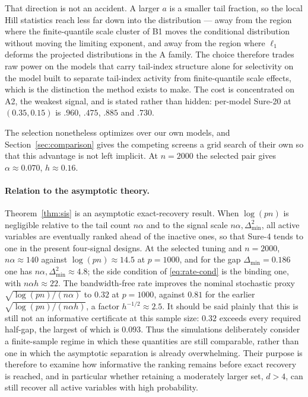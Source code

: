 That direction is not an accident. A larger $a$ is a smaller tail
fraction, so the local Hill statistics reach less far down into the
distribution --- away from the region where the finite-quantile scale
cluster of B1 moves the conditional distribution without moving the
limiting exponent, and away from the region where $\ell_1$ deforms the
projected distributions in the A family. The choice therefore trades raw
power on the models that carry tail-index structure alone for
selectivity on the model built to separate tail-index activity from
finite-quantile scale effects, which is the distinction the method
exists to make. The cost is concentrated on A2, the weakest signal, and
is stated rather than hidden: per-model Sure-20 at $(0.35,0.15)$ is
$.960$, $.475$, $.885$ and $.730$.

The selection nonetheless optimizes over our own models, and
Section~\ref{sec:comparison} gives the competing screens a grid search
of their own so that this advantage is not left implicit. At $n=2000$
the selected pair gives $\alpha\approx0.070$, $h\approx0.16$.

\paragraph{Relation to the asymptotic theory.}
Theorem~\ref{thm:sis} is an asymptotic exact-recovery result. When $\log(pn)$ is negligible relative to the tail count $n\alpha$ and to the signal scale $n\alpha,\Delta_{\min}^2$, all active variables are eventually ranked ahead of the inactive ones, so that Sure-4 tends to one in the present four-signal designs. At the selected tuning and $n=2000$, $n\alpha\approx140$ against $\log(pn)\approx14.5$ at $p=1000$, and for the gap $\Delta_{\min}=0.186$ one has $n\alpha,\Delta_{\min}^2\approx4.8$; the side condition of \eqref{eq:rate-cond} is the binding one, with $n\alpha h\approx22$. The bandwidth-free rate improves the nominal stochastic proxy $\sqrt{\log(pn)/(n\alpha)}$ to $0.32$ at $p=1000$, against $0.81$ for the earlier $\sqrt{\log(pn)/(n\alpha h)}$, a factor $h^{-1/2}\approx2.5$. It should be said plainly that this is still not an informative certificate at this sample size: $0.32$ exceeds every required half-gap, the largest of which is $0.093$. Thus the simulations deliberately consider a finite-sample regime in which these quantities are still comparable, rather than one in which the asymptotic separation is already overwhelming. Their purpose is therefore to examine how informative the ranking remains before exact recovery is reached, and in particular whether retaining a moderately larger set, $d>4$, can still recover all active variables with high probability.

